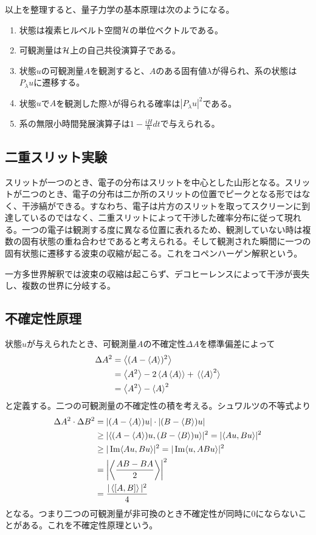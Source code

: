    以上を整理すると、量子力学の基本原理は次のようになる。
    \begin{enumerate}
        \item 状態は複素ヒルベルト空間$\mathcal{H}$の単位ベクトルである。
        \item 可観測量は$\mathcal{H}$上の自己共役演算子である。
        \item 状態$u$の可観測量$A$を観測すると、$A$のある固有値$\lambda$が得られ、系の状態は$P_\lambda u$に遷移する。
        \item 状態$u$で$A$を観測した際$\lambda$が得られる確率は$|P_\lambda u|^2$である。
        \item 系の無限小時間発展演算子は$1 - \frac{iH}{\hbar}dt$で与えられる。
    \end{enumerate}

\subsection{二重スリット実験}
    スリットが一つのとき、電子の分布はスリットを中心とした山形となる。スリットが二つのとき、電子の分布は二か所のスリットの位置でピークとなる形ではなく、干渉縞ができる。すなわち、電子は片方のスリットを取ってスクリーンに到達しているのではなく、二重スリットによって干渉した確率分布に従って現れる。一つの電子は観測する度に異なる位置に表れるため、観測していない時は複数の固有状態の重ね合わせであると考えられる。そして観測された瞬間に一つの固有状態に遷移する波束の収縮が起こる。これをコペンハーゲン解釈という。

    一方多世界解釈では波束の収縮は起こらず、デコヒーレンスによって干渉が喪失し、複数の世界に分岐する。

\subsection{不確定性原理}
    状態$u$が与えられたとき、可観測量$A$の不確定性$\Delta A$を標準偏差によって
    \begin{align*}
        \Delta A^2
            &= \ev{(A - \ev{A})^2}\\
            &= \ev{A^2} - 2\ev{A\ev{A}} + \ev*{\ev{A}^2}\\
            &= \ev{A^2} - \ev{A}^2
    \end{align*}
    と定義する。二つの可観測量の不確定性の積を考える。シュワルツの不等式より
    \begin{align*}
        \Delta A^2 \cdot \Delta B^2
            &= |(A - \ev{A})u| \cdot |(B - \ev{B})u|\\
            &\geq |\inner{(A - \ev{A})u}{(B - \ev{B})u}|^2 = |\inner{Au}{Bu}|^2\\
            &\geq |\Im\inner{Au}{Bu}|^2 = |\Im\inner{u}{ABu}|^2\\
            &= \left|\ev{\frac{AB - BA}{2}}\right|^2\\
            &= \frac{|\ev{[A, B]}|^2}{4}
    \end{align*}
    となる。つまり二つの可観測量が非可換のとき不確定性が同時に0にならないことがある。これを不確定性原理という。

